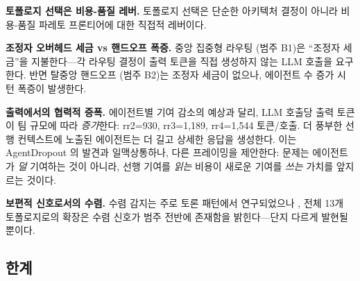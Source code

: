 \documentclass[a4paper,11pt]{article}
\begin{document}
\textbf{토폴로지 선택은 비용-품질 레버.} 토폴로지 선택은 단순한 아키텍처 결정이 아니라 비용-품질 파레토 프론티어에 대한 직접적 레버이다.

\textbf{조정자 오버헤드 세금 vs 핸드오프 폭증.} 중앙 집중형 라우팅 (범주 B1)은 ``조정자 세금''을 지불한다---각 라우팅 결정이 출력 토큰을 직접 생성하지 않는 LLM 호출을 요구한다. 반면 탈중앙 핸드오프 (범주 B2)는 조정자 세금이 없으나, 에이전트 수 증가 시 턴 폭증이 발생한다.

\textbf{출력에서의 협력적 증폭.} 에이전트별 기여 감소의 예상과 달리, LLM 호출당 출력 토큰이 팀 규모에 따라 \emph{증가}한다: rr2=930, rr3=1,189, rr4=1,544 토큰/호출. 더 풍부한 선행 컨텍스트에 노출된 에이전트는 더 길고 상세한 응답을 생성한다. 이는 AgentDropout \citep{wang2025agentdropout}의 발견과 일맥상통하나, 다른 프레이밍을 제안한다: 문제는 에이전트가 \emph{덜} 기여하는 것이 아니라, 선행 기여를 \emph{읽는} 비용이 새로운 기여를 \emph{쓰는} 가치를 앞지르는 것이다.

\textbf{보편적 신호로서의 수렴.} 수렴 감지는 주로 토론 패턴에서 연구되었으나 \citep{hu2025when}, 전체 13개 토폴로지로의 확장은 수렴 신호가 범주 전반에 존재함을 밝힌다---단지 다르게 발현될 뿐이다.

\subsection{한계}
\end{document}
